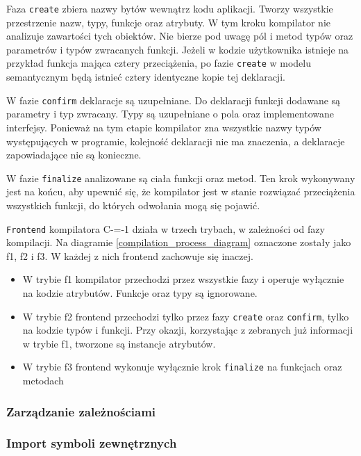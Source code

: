 Faza \lstinline{create} zbiera nazwy bytów wewnątrz kodu aplikacji.
Tworzy wszystkie przestrzenie nazw, typy, funkcje oraz atrybuty.
W tym kroku kompilator nie analizuje zawartości tych obiektów.
Nie bierze pod uwagę pól i metod typów oraz parametrów i typów zwracanych funkcji.
Jeżeli w kodzie użytkownika istnieje na przykład funkcja mająca cztery przeciążenia, po fazie \lstinline{create} w modelu semantycznym będą istnieć cztery identyczne kopie tej deklaracji.

W fazie \lstinline{confirm} deklaracje są uzupełniane.
Do deklaracji funkcji dodawane są parametry i typ zwracany.
Typy są uzupełniane o pola oraz implementowane interfejsy.
Ponieważ na tym etapie kompilator zna wszystkie nazwy typów występujących w programie, kolejność deklaracji nie ma znaczenia, a deklaracje zapowiadające nie są konieczne.

W fazie \lstinline{finalize}
analizowane są ciała funkcji oraz metod.
Ten krok wykonywany jest na końcu, aby upewnić się, że kompilator jest w stanie rozwiązać przeciążenia wszystkich funkcji, do których odwołania mogą się pojawić.

\lstinline{Frontend} kompilatora C-=-1 działa w trzech trybach, w zależności od fazy kompilacji.
Na diagramie \ref{compilation_process_diagram} oznaczone zostały jako f1, f2 i f3.
W każdej z nich frontend zachowuje się inaczej.
\begin{itemize}
  \item W trybie f1 kompilator przechodzi przez wszystkie fazy i operuje wyłącznie na kodzie atrybutów.
  Funkcje oraz typy są ignorowane.
  \item W trybie f2 frontend przechodzi tylko przez fazy \lstinline{create} oraz \lstinline{confirm}, tylko na kodzie typów i funkcji.
  Przy okazji, korzystając z zebranych już informacji w trybie f1, tworzone są instancje atrybutów.
  \item W trybie f3 frontend wykonuje wyłącznie krok \lstinline{finalize} na funkcjach oraz metodach
\end{itemize}


\subsubsection{Zarządzanie zależnościami}

\subsubsection{Import symboli zewnętrznych}

